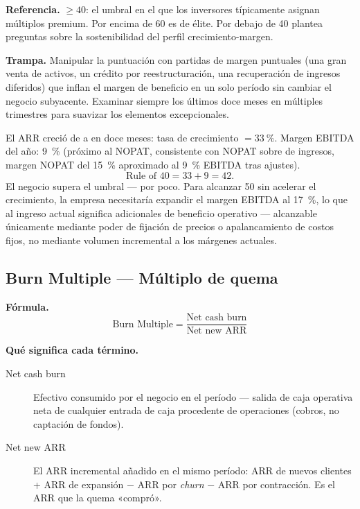 \textbf{Referencia.} $\ge 40$: el umbral en el que los inversores típicamente asignan
múltiplos premium. Por encima de 60 es de élite. Por debajo de 40 plantea preguntas sobre
la sostenibilidad del perfil crecimiento-margen.

\textbf{Trampa.} Manipular la puntuación con partidas de margen puntuales (una gran venta de
activos, un crédito por reestructuración, una recuperación de ingresos diferidos) que inflan
el margen de beneficio en un solo período sin cambiar el negocio subyacente. Examinar siempre
los últimos doce meses en múltiples trimestres para suavizar los elementos excepcionales.

\begin{example}
El ARR creció de  a  en doce meses: tasa de crecimiento
$= \qty{33}{\percent}$. Margen EBITDA del año: \qty{9}{\percent} (próximo al NOPAT,
consistente con  NOPAT sobre  de ingresos, margen NOPAT del
\qty{15}{\percent} aproximado al \qty{9}{\percent} EBITDA tras ajustes).
\[
  \text{Rule of 40} = 33 + 9 = 42.
\]
El negocio supera el umbral --- por poco. Para alcanzar 50 sin acelerar el crecimiento, la
empresa necesitaría expandir el margen EBITDA al \qty{17}{\percent}, lo que al ingreso actual
significa  adicionales de beneficio operativo --- alcanzable únicamente mediante
poder de fijación de precios o apalancamiento de costos fijos, no mediante volumen incremental
a los márgenes actuales.
\end{example}


\subsection{Burn Multiple --- Múltiplo de quema}

\textbf{Fórmula.}
\[
  \text{Burn Multiple} = \frac{\text{Net cash burn}}{\text{Net new ARR}}
\]

\textbf{Qué significa cada término.}
\begin{description}
  \item[Net cash burn] Efectivo consumido por el negocio en el período --- salida de caja
    operativa neta de cualquier entrada de caja procedente de operaciones (cobros, no
    captación de fondos).
  \item[Net new ARR] El ARR incremental añadido en el mismo período: ARR de nuevos clientes
    + ARR de expansión $-$ ARR por \emph{churn} $-$ ARR por contracción. Es el ARR que la
    quema «compró».
\end{description}

